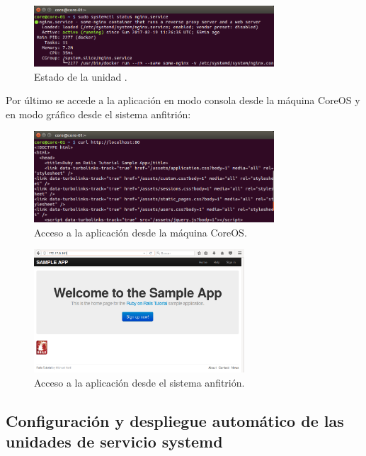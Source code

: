 \begin{figure}[H]
\centering
\includegraphics[width=0.8\textwidth]{images/figures/nginx.service.png}
\caption{Estado de la unidad .\label{fig:figure_placement_example}}
\end{figure}

Por último se accede a la aplicación en modo consola desde la máquina CoreOS y en modo gráfico desde el sistema anfitrión:

\begin{figure}[H]
\centering
\includegraphics[width=0.8\textwidth]{images/figures/coreosmanualcurl.png}
\caption{Acceso a la aplicación desde la máquina CoreOS.\label{fig:figure_placement_example}}
\end{figure}

\begin{figure}[H]
\centering
\includegraphics[width=0.7\textwidth]{images/figures/coreosmanualhost.png}
\caption{Acceso a la aplicación desde el sistema anfitrión.\label{fig:figure_placement_example}}
\end{figure}

\subsection{Configuración y despliegue automático de las unidades de servicio systemd}

